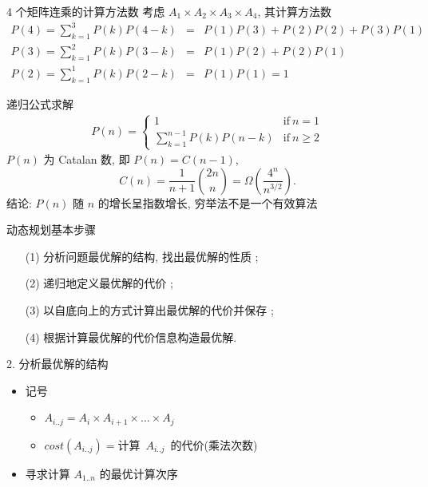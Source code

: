 \documentclass[fontset=fandol,UTF8,fleqn]{beamer}
\begin{document}
\begin{frame}{4 个矩阵连乘的计算方法数}
考虑 $A_1\times A_2\times A_3 \times A_4$, 其计算方法数  
\small{
\begin{eqnarray*}
  P(4) = \sum_{k=1}^3P(k)P(4-k) & = & P(1)P(3)+P(2)P(2)+P(3)P(1)  \\
  P(3)  = \sum_{k=1}^2P(k)P(3-k) & = &  P(1)P(2)+P(2)P(1)  \\
P(2) =  \sum_{k=1}^1P(k)P(2-k) & = & P(1)P(1)=1  
\end{eqnarray*}
}
\end{frame}

\begin{frame}{递归公式求解}
\begin{eqnarray*}
  P(n)=\left\{\begin{array}{ll}
1 & \textrm{if}\ n = 1\\
\sum_{k=1}^{n-1}P(k)P(n-k) &  \textrm{if}\ n \geq 2
\end{array}\right. 
\end{eqnarray*}
$P(n)$ 为 Catalan 数, 即 $P(n)=C(n-1)$,  
\begin{displaymath}
  C(n)=\frac{1}{n+1} {2n \choose n}=\Omega(\frac{4^n}{n^{3/2}}). 
\end{displaymath}
 结论: $P(n)$ 随 $n$ 的增长呈指数增长, 穷举法不是一个有效算法 
\end{frame}

\begin{frame}{动态规划基本步骤}
  \begin{itemize}[<+-|alert@+>]
\item[(1)] 分析问题最优解的结构, 找出最优解的性质 ;
\item[(2)] 递归地定义最优解的代价 ;
\item[(3)] 以自底向上的方式计算出最优解的代价并保存 ;
\item[(4)] 根据计算最优解的代价信息构造最优解. 
\end{itemize}
\end{frame}

\begin{frame}{2. 分析最优解的结构}
  \begin{itemize}[<+-|alert@+>]
\item 记号
  \begin{itemize}
\item $A_{i..j}=A_i\times A_{i+1}\times \ldots \times A_j$  
\item $cost(A_{i..j})=$计算~$A_{i..j}$~的代价(乘法次数)  
\end{itemize}

\item 寻求计算 $A_{1..n}$ 的最优计算次序 
\end{itemize}
\end{frame}
\end{document}
